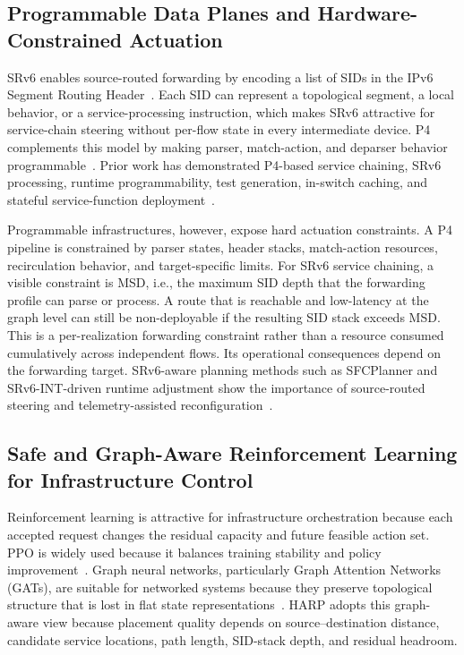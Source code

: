 \documentclass[final,5p]{elsarticle}
\newcommand{\rev}[1]{\textcolor{BrickRed}{#1}}
\begin{document}
\subsection{Programmable Data Planes and Hardware-Constrained Actuation}
\label{subsec:related_pdp}

SRv6 enables source-routed forwarding by encoding a list of SIDs in the IPv6 Segment Routing Header~\cite{filsfils2015segment,rfc8986,rfc9352}. Each SID can represent a topological segment, a local behavior, or a service-processing instruction, which makes SRv6 attractive for service-chain steering without per-flow state in every intermediate device. P4 complements this model by making parser, match-action, and deparser behavior programmable~\cite{jeyakumar2014p4}. Prior work has demonstrated P4-based service chaining, SRv6 processing, runtime programmability, test generation, in-switch caching, and stateful service-function deployment~\cite{stockmayer2020p4sfc,xiang2019p4sc,yang2024p4runpro,ruffy2023p4testgen,zhao2023p4lru,ma2024sfcache,li2024stsfc}.

Programmable infrastructures, however, expose hard actuation constraints. A P4 pipeline is constrained by parser states, header stacks, match-action resources, recirculation behavior, and target-specific limits. For SRv6 service chaining, a visible constraint is \rev{MSD}, i.e., the maximum SID depth that the forwarding profile can parse or process. A route that is reachable and low-latency at the graph level can still be non-deployable if the resulting SID stack exceeds MSD. \rev{This is a per-realization forwarding constraint rather than a resource consumed cumulatively across independent flows. Its operational consequences depend on the forwarding target.} SRv6-aware planning methods such as SFCPlanner and SRv6-INT-driven runtime adjustment show the importance of source-routed steering and telemetry-assisted reconfiguration~\cite{qiu2024sfcplanner,yan2024srv6int}.

\subsection{Safe and Graph-Aware Reinforcement Learning for Infrastructure Control}
\label{subsec:related_safe_rl}

Reinforcement learning is attractive for infrastructure orchestration because each accepted request changes the residual capacity and future feasible action set. PPO is widely used because it balances training stability and policy improvement~\cite{schulman2017proximal}. Graph neural networks, particularly Graph Attention Networks (GATs), are suitable for networked systems because they preserve topological structure that is lost in flat state representations~\cite{velickovic2018graph}. HARP adopts this graph-aware view because placement quality depends on source--destination distance, candidate service locations, path length, SID-stack depth, and residual headroom.
\end{document}
